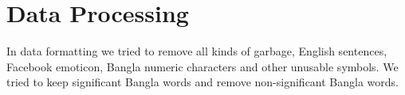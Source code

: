 \documentclass{standalone}
\begin{document}
\section{Data Processing}
In data formatting we tried to remove all kinds of garbage, English sentences, Facebook emoticon, Bangla numeric characters and other unusable symbols. We tried to keep significant Bangla words and remove non-significant Bangla words.
\end{document}
